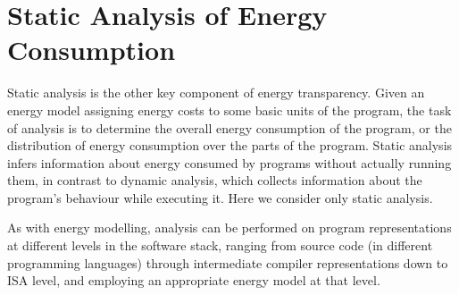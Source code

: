 
\section{Static Analysis of Energy Consumption}\label{sec:energy-analysis}

Static analysis is the other key component of energy transparency.
Given an energy model assigning energy costs to some basic units of the program,
the task of analysis is to determine the overall energy consumption of the program, or
the distribution of energy consumption over the parts of the program.
Static analysis infers information about energy consumed by programs without
actually running them, in contrast to dynamic analysis, which collects information
about the program's behaviour while executing it.  Here we consider only static analysis.

As with energy modelling, analysis can be performed on
program representations at different levels 
in the software stack, ranging from source code (in different programming
languages) through intermediate compiler representations down to ISA level, and employing
an appropriate energy model at that level.



